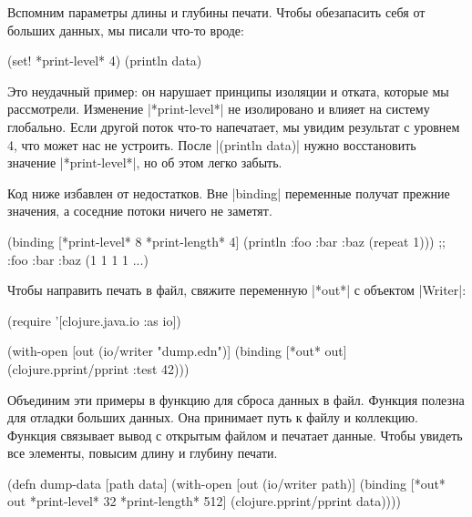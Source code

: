 Вспомним параметры длины и глубины печати. Чтобы обезапасить себя от больших
данных, мы писали что-то вроде:

\begin{english}
  \begin{clojure}
(set! *print-level* 4)
(println data)
  \end{clojure}
\end{english}


Это неудачный пример: он нарушает принципы изоляции и отката, которые мы
рассмотрели. Изменение \spverb|*print-level*| не изолировано и влияет на систему
глобально. Если другой поток что-то напечатает, мы увидим результат с уровнем 4,
что может нас не устроить. После \spverb|(println data)| нужно
восстановить значение \spverb|*print-level*|, но об этом легко забыть.

Код ниже избавлен от недостатков. Вне \spverb|binding| переменные получат
прежние значения, а соседние потоки ничего не заметят.

\begin{english}
  \begin{clojure}
(binding [*print-level* 8
          *print-length* 4]
  (println {:foo {:bar {:baz (repeat 1)}}}))
;; {:foo {:bar {:baz (1 1 1 1 ...)}}}
  \end{clojure}
\end{english}


Чтобы направить печать в файл, свяжите переменную \spverb|*out*| с объектом
\spverb|Writer|:

\begin{english}
  \begin{clojure}
(require '[clojure.java.io :as io])

(with-open [out (io/writer "dump.edn")]
  (binding [*out* out]
    (clojure.pprint/pprint {:test 42})))
  \end{clojure}
\end{english}

Объединим эти примеры в функцию для сброса данных в файл. Функция полезна для
отладки больших данных. Она принимает путь к файлу и коллекцию. Функция
связывает вывод с открытым файлом и печатает данные. Чтобы увидеть все элементы,
повысим длину и глубину печати.

\begin{english}
  \begin{clojure}
(defn dump-data
  [path data]
  (with-open [out (io/writer path)]
    (binding [*out* out
              *print-level* 32
              *print-length* 512]
      (clojure.pprint/pprint data))))
  \end{clojure}
\end{english}

